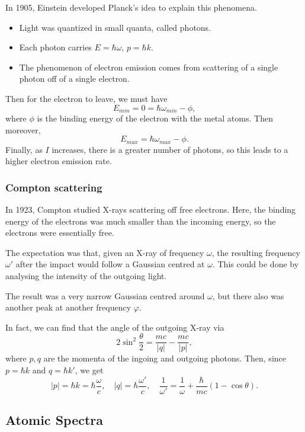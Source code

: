 \documentclass[12pt]{article}
\theoremstyle{definition}
\theoremstyle{remark}
\begin{document}
In 1905, Einstein developed Planck's idea to explain this phenomena.
\begin{itemize}
	\item Light was quantized in small quanta, called photons.
	\item Each photon carries $E = \hbar \omega$, $p = \hbar k$.
	\item The phenomenon of electron emission comes from scattering of a single photon off of a single electron.
\end{itemize}

Then for the electron to leave, we must have
\[
E_{min} = 0  = \hbar \omega_{min} - \phi
,\]
where $\phi$ is the binding energy of the electron with the metal atoms. Then moreover,
\[
E_{max} = \hbar \omega_{max} - \phi
.\]
Finally, as $I$ increases, there is a greater number of photons, so this leads to a higher electron emission rate.

\subsubsection{Compton scattering}%
\label{subsub:compton_scattering}

In 1923, Compton studied X-rays scattering off free electrons. Here, the binding energy of the electrons was much smaller than the incoming energy, so the electrons were essentially free.

The expectation was that, given an X-ray of frequency $\omega$, the resulting frequency $\omega'$ after the impact would follow a Gaussian centred at $\omega$. This could be done by analysing the intensity of the outgoing light.

The result was a very narrow Gaussian centred around $\omega$, but there also was another peak at another frequency $\varphi$.

In fact, we can find that the angle of the outgoing X-ray via
\[
2 \sin^2 \frac{\theta}{2} = \frac{mc}{|q|} - \frac{mc}{|p|}
,\]
where $p, q$ are the momenta of the ingoing and outgoing photons. Then, since $p = \hbar k$ and $q = \hbar k'$, we get
\[
	|p| = \hbar k = \hbar \frac{\omega}{c}, \quad |q| = \hbar \frac{\omega'}{c}, \quad \frac{1}{\omega'} = \frac{1}{\omega} + \frac{\hbar}{mc}(1 - \cos \theta)
.\]

\subsection{Atomic Spectra}%
\label{sub:atomic_spectra}
\end{document}
